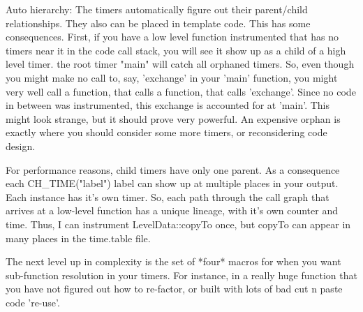 \begin{DoxyVerb}
 \par Auto hierarchy:
 The timers automatically figure out their parent/child relationships.  They
 also can be placed in template code.  This has some consequences.  First,
 if you have a low level function instrumented that has no timers near it in
 the code call stack, you will see it show up as a child of a high level timer.
 the root timer "main" will catch all orphaned timers.  So, even though you
 might make no call to, say, 'exchange' in your 'main' function, you might
 very well call a function, that calls a function, that calls 'exchange'. Since
 no code in between was instrumented, this exchange is accounted for at 'main'.
 This might look strange, but it should prove very powerful. An expensive orphan
 is exactly where you should consider some more timers, or reconsidering code
 design.

 \par
  For performance reasons, child timers have only one parent.  As a consequence
  each CH_TIME("label") label can show up at multiple places in your output. Each
  instance has it's own timer.  So, each path through the call graph that arrives
  at a low-level function has a unique lineage, with it's own counter and time.
  Thus, I can instrument LevelData::copyTo once, but copyTo can appear in many
  places in the time.table file.


 The next level up in complexity is the set of *four* macros for when you want
 sub-function resolution in your timers. For instance, in a really huge function
 that you have not figured out how to re-factor, or built with lots of bad cut n paste
 code 're-use'.
\end{DoxyVerb}
 
